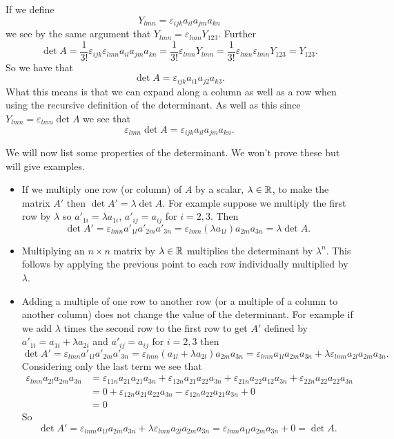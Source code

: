 \documentclass[a4paper]{article}
\begin{document}
    If we define
    \[Y_{lmn} = \varepsilon_{ijk}a_{il}a_{jm}a_{kn}\]
    we see by the same argument that \(Y_{lmn} = \varepsilon_{lmn}Y_{123}\).
    Further
    \[\det A = \frac{1}{3!}\varepsilon_{ijk}\varepsilon_{lmn}a_{il}a_{jm}a_{kn} = \frac{1}{3!}\varepsilon_{lmn}Y_{lmn} = \frac{1}{3!}\varepsilon_{lmn}\varepsilon_{lmn}Y_{123} = Y_{123}.\]
    So we have that
    \[\det A = \varepsilon_{ijk}a_{i1}a_{j2}a_{k3}.\]
    What this means is that we can expand along a column as well as a row when using the recursive definition of the determinant.
    As well as this since \(Y_{lmn} = \varepsilon_{lmn}\det A\) we see that
    \[\varepsilon_{lmn}\det A = \varepsilon_{ijk}a_{il}a_{jm}a_{kn}.\]
    
    We will now list some properties of the determinant.
    We won't prove these but will give examples.
    \begin{itemize}
        \item If we multiply one row (or column) of \(A\) by a scalar, \(\lambda\in\mathbb{R}\), to make the matrix \(A'\)  then \(\det A' = \lambda\det A\).
        For example suppose we multiply the first row by \(\lambda\) so \(a'_{1i} = \lambda a_{1i}\), \(a'_{ij} = a_{ij}\) for \(i = 2, 3\).
        Then
        \[\det A' = \varepsilon_{lmn}a'_{1l}a'_{2m}a'_{3n} = \varepsilon_{lmn}(\lambda a_{1l})a_{2m}a_{3n} = \lambda \det A.\]
        
        \item Multiplying an \(n\times n\) matrix by \(\lambda\in\mathbb{R}\) multiplies the determinant by \(\lambda^n\).
        This follows by applying the previous point to each row individually multiplied by \(\lambda\).
        
        \item Adding a multiple of one row to another row (or a multiple of a column to another column) does not change the value of the determinant.
        For example if we add \(\lambda\) times the second row to the first row to get \(A'\) defined by \(a'_{1i} = a_{1i} + \lambda a_{2i}\) and \(a'_{ij} = a_{ij}\) for \(i = 2, 3\) then
        \[\det A' = \varepsilon_{lmn}a'_{1l}a'_{2m}a'_{3n} = \varepsilon_{lmn}(a_{1l} + \lambda a_{2l})a_{2m}a_{3n} = \varepsilon_{lmn}a_{1l}a_{2m}a_{3n} + \lambda\varepsilon_{lmn}a_{2l}a_{2m}a_{3n}.\]
        Considering only the last term we see that
        \begin{align*}
            \varepsilon_{lmn}a_{2l}a_{2m}a_{3n} &= \varepsilon_{11n}a_{21}a_{21}a_{3n} + \varepsilon_{12n}a_{21}a_{22}a_{3n} + \varepsilon_{21n}a_{22}a_{12}a_{3n} + \varepsilon_{22n}a_{22}a_{22}a_{3n}\\
            &= 0 + \varepsilon_{12n}a_{21}a_{22}a_{3n} - \varepsilon_{12n}a_{22}a_{21}a_{3n} + 0\\
            &= 0
        \end{align*}
        So
        \[\det A' = \varepsilon_{lmn}a_{1l}a_{2m}a_{3n} + \lambda\varepsilon_{lmn}a_{2l}a_{2m}a_{3n} = \varepsilon_{lmn}a_{1l}a_{2m}a_{3n} + 0 = \det A.\]
        

\end{itemize}
\end{document}
